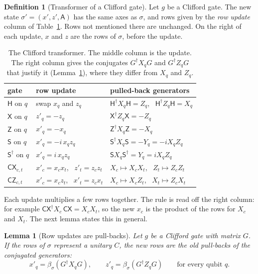 \documentclass[11pt]{article}
\newtheorem{lemma}[theorem]{Lemma}
\theoremstyle{definition}
\newtheorem{definition}[theorem]{Definition}
\theoremstyle{remark}
\newcommand{\adj}{^{\dagger}}
\newcommand{\Ax}{\mathsf{A}}
\newcommand{\back}{\beta}
\newcommand{\gate}[1]{\mathsf{#1}}
\begin{document}
\begin{definition}[Transformer of a Clifford gate]\label{def:clifford-step}
Let $g$ be a Clifford gate. The new state $\sigma' = (x', z', \Ax)$ has the same axes as
$\sigma$, and rows given by the \emph{row update} column of Table~\ref{tab:rows}. Rows not
mentioned there are unchanged. On the right of each update, $x$ and $z$ are the rows of
$\sigma$, before the update.
\end{definition}

\begin{table}[h]
\centering
\renewcommand{\arraystretch}{1.3}
\begin{tabular}{lll}
\toprule
gate & row update & pulled-back generators \\
\midrule
$\gate{H}$ on $q$ & swap $x_q$ and $z_q$ & $\gate H\adj X_q \gate H = Z_q$, \ $\gate H\adj Z_q \gate H = X_q$ \\
$\gate{X}$ on $q$ & $z'_q = -z_q$ & $\gate X\adj Z_q \gate X = -Z_q$ \\
$\gate{Z}$ on $q$ & $x'_q = -x_q$ & $\gate Z\adj X_q \gate Z = -X_q$ \\
$\gate{S}$ on $q$ & $x'_q = -i\,x_q z_q$ & $\gate S\adj X_q \gate S = -Y_q = -i X_q Z_q$ \\
$\gate{S}\adj$ on $q$ & $x'_q = i\,x_q z_q$ & $\gate S X_q \gate S\adj = Y_q = i X_q Z_q$ \\
$\gate{CX}_{c,t}$ & $x'_c = x_c x_t$, \ $z'_t = z_c z_t$ & $X_c \mapsto X_c X_t$, \ $Z_t \mapsto Z_c Z_t$ \\
$\gate{CZ}_{c,t}$ & $x'_c = x_c z_t$, \ $x'_t = z_c x_t$ & $X_c \mapsto X_c Z_t$, \ $X_t \mapsto Z_c X_t$ \\
\bottomrule
\end{tabular}
\caption{The Clifford transformer. The middle column is the update. The right column gives
the conjugates $G\adj X_q G$ and $G\adj Z_q G$ that justify it (Lemma~\ref{lem:rows}),
where they differ from $X_q$ and $Z_q$.}
\label{tab:rows}
\end{table}

Each update multiplies a few rows together. The rule is read off the right column: for
example $\gate{CX}\adj X_c\, \gate{CX} = X_c X_t$, so the new $x_c$ is the product of the
rows for $X_c$ and $X_t$. The next lemma states this in general.

\begin{lemma}[Row updates are pull-backs]\label{lem:rows}
Let $g$ be a Clifford gate with matrix $G$. If the rows of $\sigma$ represent a unitary $C$,
the new rows are the old pull-backs of the conjugated generators:
\[
  x'_q = \back_\sigma(G\adj X_q G), \qquad z'_q = \back_\sigma(G\adj Z_q G)
  \qquad\text{for every qubit } q.
\]
\end{lemma}
\end{document}
